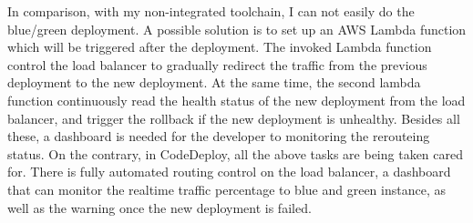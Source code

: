 \par
In comparison, with my non-integrated toolchain, I can not easily do the blue/green deployment. A possible solution is to set up an AWS Lambda function which will be triggered after the deployment. The invoked Lambda function control the load balancer to gradually redirect the traffic from the previous deployment to the new deployment. At the same time, the second lambda function continuously read the health status of the new deployment from the load balancer, and trigger the rollback if the new deployment is unhealthy. 
Besides all these, a dashboard is needed for the developer to monitoring the rerouteing status. On the contrary, in CodeDeploy, all the above tasks are being taken cared for. There is fully automated routing control on the load balancer, a dashboard that can monitor the realtime traffic percentage to blue and green instance, as well as the warning once the new deployment is failed.

